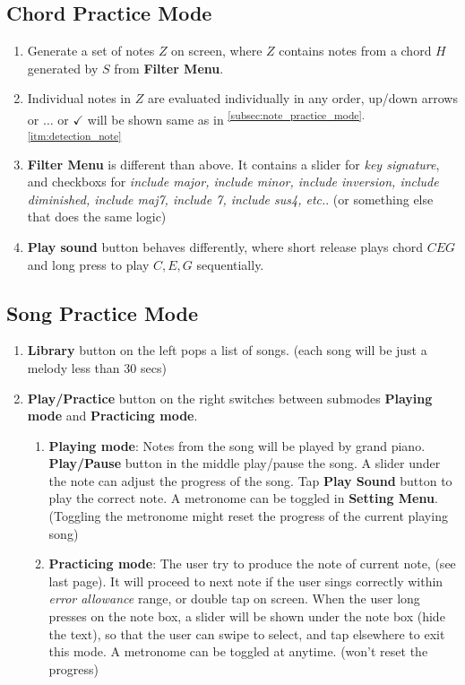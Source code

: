 \documentclass{article}
\begin{document}
\subsection{Chord Practice Mode}
\label{subsec:chord_practice_mode}
\begin{enumerate}
  \item \label{itm:question_chord} Generate a set of notes $Z$ on screen, where $Z$ contains notes from a chord $H$ generated by $S$ from \textbf{Filter Menu}. 
  \item \label{itm:detection_chord} Individual notes in $Z$ are evaluated individually in any order, up/down arrows or $\ldots$ or $\checkmark$ will be shown same as in \textsuperscript{\ref{subsec:note_practice_mode}.\ref{itm:detection_note}}
  \item \label{itm:filter_chord} \textbf{Filter Menu} is different than above. It contains a slider for \textit{key signature}, and checkboxs for \textit{include major, include minor, include inversion, include diminished, include maj7, include 7, include sus4, etc.}. (or something else that does the same logic)
  \item \label{itm:playsound_chord} \textbf{Play sound} button behaves differently, where short release plays chord $CEG$ and long press to play $C, E, G$ sequentially.

\end{enumerate}

\subsection{Song Practice Mode}
\label{subsec:song_practice_mode}
\begin{enumerate}
  \item\label{itm:library} \textbf{Library} button on the left pops a list of songs. (each song will be just a melody less than 30 secs)
  \item\label{itm:submodes} \textbf{Play/Practice} button on the right switches between submodes \textbf{Playing mode} and \textbf{Practicing mode}. 
    \begin{enumerate}
      \item\label{itm:playing_mode}\textbf{Playing mode}: Notes from the song will be played by grand piano. 
						\textbf{Play/Pause} button in the middle play/pause the song.
						A slider under the note can adjust the progress of the song.
						Tap \textbf{Play Sound} button to play the correct note. A metronome can be toggled in \textbf{Setting Menu}. (Toggling the metronome might reset the progress of the current playing song)
          \item\label{itm:practice_mode}\textbf{Practicing mode}: The user try to produce the note of current note, (see last page). It will proceed to next note if the user sings correctly within \textit{error allowance} range, or double tap on screen. When the user long presses on the note box, a slider will be shown under the note box (hide the text), so that the user can swipe to select, and tap elsewhere to exit this mode. A metronome can be toggled at anytime. (won't reset the progress)
    \end{enumerate}

\end{enumerate}
\end{document}

